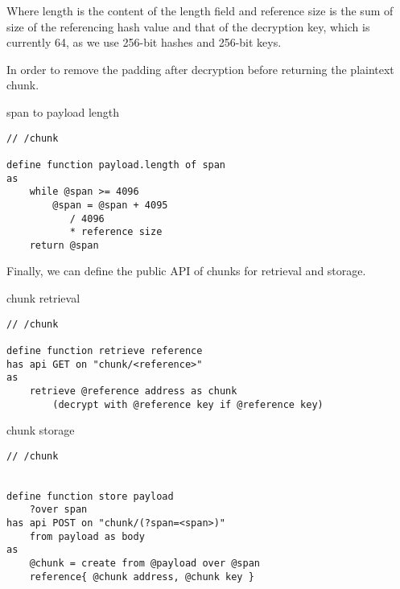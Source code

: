 Where length is the content of the length field and reference  size is the sum of size of the referencing hash value and that of the decryption key, which is currently 64, as we use 256-bit hashes and 256-bit keys.

In order to remove the padding after decryption before returning the plaintext chunk. 

\begin{definition}{span to payload length}\label{def:span}
\begin{lstlisting}[language=buzz1]
// /chunk

define function payload.length of span
as
    while @span >= 4096 
        @span = @span + 4095
           / 4096
           * reference size
    return @span
\end{lstlisting}
\end{definition}

Finally, we can define the public API of chunks  for retrieval and storage.

\begin{definition}{chunk retrieval}\label{def:retrieve}
\begin{lstlisting}[language=buzz1]
// /chunk

define function retrieve reference
has api GET on "chunk/<reference>"
as 
    retrieve @reference address as chunk
        (decrypt with @reference key if @reference key)
\end{lstlisting}
\end{definition}


\begin{definition}{chunk storage}\label{def:store}
\begin{lstlisting}[language=buzz1]
// /chunk


define function store payload
    ?over span 
has api POST on "chunk/(?span=<span>)"
    from payload as body
as 
    @chunk = create from @payload over @span
    reference{ @chunk address, @chunk key }
\end{lstlisting}
\end{definition}


